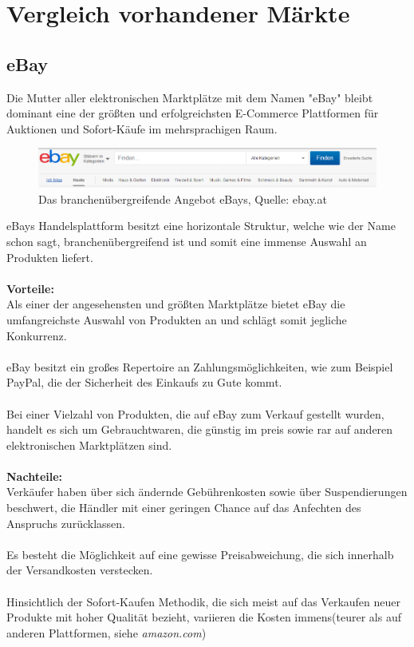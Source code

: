 \documentclass[11pt,a4paper]{article}
\begin{document}
\section{Vergleich vorhandener Märkte}

\subsection{eBay}

Die Mutter aller elektronischen Marktplätze mit dem Namen "eBay" bleibt dominant eine der größten und erfolgreichsten E-Commerce Plattformen für Auktionen und Sofort-Käufe im mehrsprachigen Raum.

\begin{figure}[ht!]
	\centering
	\includegraphics[width=180mm]{ebay}
	\caption{Das branchenübergreifende Angebot eBays, Quelle: ebay.at \label{ebay}}
\end{figure}

\noindent eBays Handelsplattform besitzt eine horizontale Struktur, welche wie der Name schon sagt, branchenübergreifend ist und somit eine immense Auswahl an Produkten liefert. \\ \\

\noindent \textbf{Vorteile:} \\ 
Als einer der angesehensten und größten Marktplätze bietet eBay die umfangreichste Auswahl von Produkten an und schlägt somit jegliche Konkurrenz. \\ \\
eBay besitzt ein großes Repertoire an Zahlungsmöglichkeiten, wie zum Beispiel PayPal, die der Sicherheit des Einkaufs zu Gute kommt.
\\ \\
Bei einer Vielzahl von Produkten, die auf eBay zum Verkauf gestellt wurden, handelt es sich um Gebrauchtwaren, die günstig im preis sowie rar auf anderen elektronischen Marktplätzen sind. \\ \\

\noindent \textbf{Nachteile:} \\
Verkäufer haben über sich ändernde Gebührenkosten sowie über Suspendierungen beschwert, die Händler mit einer geringen Chance auf das Anfechten des Anspruchs zurücklassen.\\ \\
Es besteht die Möglichkeit auf eine gewisse Preisabweichung, die sich innerhalb der Versandkosten verstecken. \\ \\
Hinsichtlich der Sofort-Kaufen Methodik, die sich meist auf das Verkaufen neuer Produkte mit hoher Qualität bezieht, variieren die Kosten immens(teurer als auf anderen Plattformen, siehe \textit{amazon.com})
\end{document}
